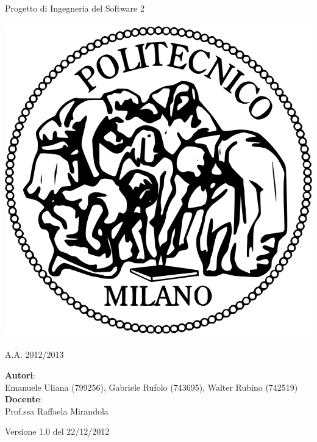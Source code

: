 \documentclass[a4paper,12pt]{article}
\begin{document}
\vspace*{\fill}
\begin{center}
{\fontsize{28}{10} \selectfont \textcolor{mygrey}{Progetto di Ingegneria del Software 2} \\[2\baselineskip]} {\fontsize{42}{10} \selectfont {\bfseries SWIMv2}} \\[4\baselineskip]
\includegraphics[scale=0.4]{polimi.png} \\[4\baselineskip]
{\fontsize{28}{10} \selectfont {\bfseries \textcolor{blue}{Design Document}} \\[2\baselineskip] A.A. 2012/2013}
\end{center}
\begin{flushleft}
{\fontsize{18}{10}
{\bfseries Autori}: \\ Emanuele Uliana (799256), Gabriele Rufolo (743695), Walter Rubino (742519) \\[1\baselineskip]
{\bfseries Docente}: \\ Prof.ssa Raffaela Mirandola
}
\end{flushleft}
\vspace*{\fill}
\begin{center}
Versione 1.0 del 22/12/2012 \\
\end{center}

\clearpage
\end{document}
